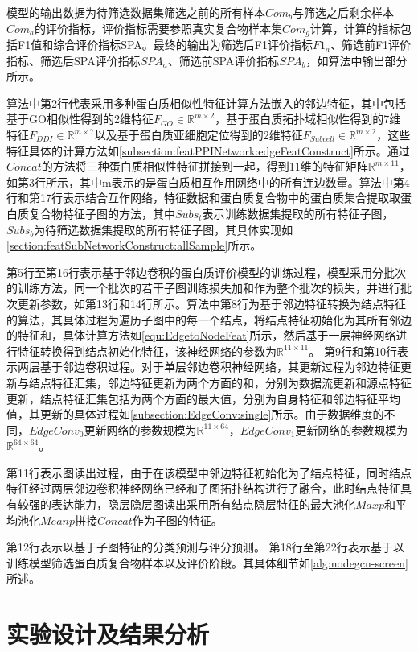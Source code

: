 模型的输出数据为待筛选数据集筛选之前的所有样本$Com_b$与筛选之后剩余样本$Com_a$的评价指标，评价指标需要参照真实复合物样本集$Com_g$计算，计算的指标包括F1值和综合评价指标SPA。最终的输出为筛选后F1评价指标$F1_a$、筛选前F1评价指标、筛选后SPA评价指标$SPA_a$、筛选前SPA评价指标$SPA_b$，如算法中输出部分所示。

算法中第2行代表采用多种蛋白质相似性特征计算方法嵌入的邻边特征，其中包括基于GO相似性得到的2维特征$F_{GO}\in \mathbb{R}^{m\times 2}$，基于蛋白质拓扑域相似性得到的7维特征$F_{DDI}\in \mathbb{R}^{m\times 7}$以及基于蛋白质亚细胞定位得到的2维特征$F_{Subcell}\in \mathbb{R}^{m\times 2}$，这些特征具体的计算方法如\ref{subsection:featPPINetwork:edgeFeatConstruct}所示。通过$Concat$的方法将三种蛋白质相似性特征拼接到一起，得到11维的特征矩阵$\mathbb{R}^{m\times 11}$，如第3行所示，其中m表示的是蛋白质相互作用网络中的所有连边数量。算法中第4行和第17行表示结合互作网络，特征数据和蛋白质复合物中的蛋白质集合提取取蛋白质复合物特征子图的方法，其中$Subs_t$表示训练数据集提取的所有特征子图，$Subs_b$为待筛选数据集提取的所有特征子图，其具体实现如\ref{section:featSubNetworkConstruct:allSample}所示。

第5行至第16行表示基于邻边卷积的蛋白质评价模型的训练过程，模型采用分批次的训练方法，同一个批次的若干子图训练损失加和作为整个批次的损失，并进行批次更新参数，如第13行和14行所示。算法中第8行为基于邻边特征转换为结点特征的算法，其具体过程为遍历子图中的每一个结点，将结点特征初始化为其所有邻边的特征和，具体计算方法如\ref{equ:EdgetoNodeFeat}所示，然后基于一层神经网络进行特征转换得到结点初始化特征，该神经网络的参数为$\mathbb{R}^{11\times 11}$。
第9行和第10行表示两层基于邻边卷积过程。对于单层邻边卷积神经网络，其更新过程为邻边特征更新与结点特征汇集，邻边特征更新为两个方面的和，分别为数据流更新和源点特征更新，结点特征汇集包括为两个方面的最大值，分别为自身特征和邻边特征平均值，其更新的具体过程如\ref{subsection:EdgeConv:single}所示。由于数据维度的不同，$EdgeConv_0$更新网络的参数规模为$\mathbb{R}^{11\times 64}$，$EdgeConv_1$更新网络的参数规模为$\mathbb{R}^{64\times 64}$。

第11行表示图读出过程，由于在该模型中邻边特征初始化为了结点特征，同时结点特征经过两层邻边卷积神经网络已经和子图拓扑结构进行了融合，此时结点特征具有较强的表达能力，隐层隐层图读出采用所有结点隐层特征的最大池化$Maxp$和平均池化$Meanp$拼接$Concat$作为子图的特征。

第12行表示以基于子图特征的分类预测与评分预测。
第18行至第22行表示基于以训练模型筛选蛋白质复合物样本以及评价阶段。其具体细节如\ref{alg:nodegcn-screen}所述。


\section{实验设计及结果分析}
\label{section:EdgeConv:experience}

